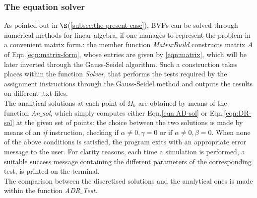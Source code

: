 \documentclass[11pt]{article}
\theoremstyle{theorem}
\theoremstyle{definition}
\begin{document}
\subsubsection{The equation solver}
As pointed out in $\S$(\ref{subsec:the-present-case}), BVPs can be solved through numerical methods for linear algebra, if one manages to represent the problem in a convenient matrix form.: the member function \emph{MatrixBuild} constructs matrix $A$ of Eqn.\eqref{eqn:matrix-form}, whose entries are given by \eqref{eqn:matrix}, which will be later inverted through the Gauss-Seidel algorithm. Such a construction takes places within the function \emph{Solver}, that performs the tests required by the assignment instructions through the Gauss-Seidel method and outputs the results on different .txt files.\\ 
The analitical solutions at each point of $\Omega_h$ are obtained by means of the function \emph{An$\_$sol}, which simply computes either Eqn.\eqref{eqn:AD-sol} or Eqn.\eqref{eqn:DR-sol} at the given set of points: the choice between the two solutions is made by means of an \emph{if} instruction, checking if $\alpha\neq 0, \gamma=0$ or if $\alpha\neq 0, \beta=0$. When none of the above conditions is satisfied, the program exits with an appropriate error message to the user. For clarity reasons,  each time a simulation is performed, a suitable success message containing the different parameters of the corresponding test, is printed on the terminal.\\
The comparison between the discretised solutions and the analytical ones is made within the function \emph{ADR$\_$Test}. 
\end{document}
